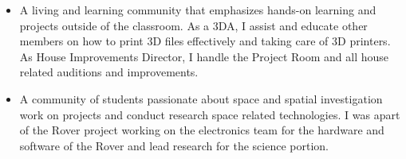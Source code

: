 \documentclass[10pt,a4paper]{altacv}
\begin{document}
\begin{itemize}
	\item A living and learning community that emphasizes hands-on learning and projects outside of the classroom. As a 3DA, I assist and educate other members on how to print 3D files effectively and taking care of 3D printers. As House Improvements Director, I handle the Project Room and all house related auditions and improvements.
\end{itemize}
\divider

%


\begin{itemize}
	\item A community of students passionate about space and spatial investigation work on projects and conduct research space related technologies. I was apart of the Rover project working on the electronics team for the hardware and software of the Rover and lead research for the science portion.
\end{itemize}

%
\end{document}
